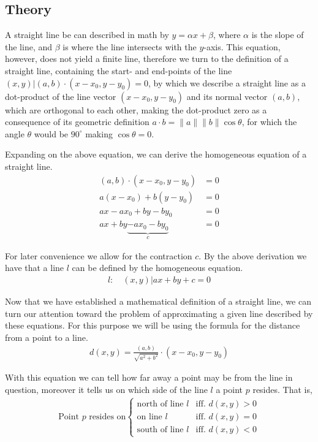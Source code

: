 \documentclass[11pt]{article}
\newcommand{\norm}[1]{\lVert#1\rVert}
\begin{document}
\subsection{Theory}
A straight line be can described in math by $y = \alpha x + \beta$, where
$\alpha$ is the slope of the line, and $\beta$ is where the line intersects
with the $y$-axis. This equation, however, does not yield a finite line,
therefore we turn to the definition of a straight line, containing the start-
and end-points of the line ${(x,y) | (a,b) \cdot (x - x_0, y - y_0) = 0}$,
by which we describe a straight line as a dot-product of the line vector
$(x - x_0, y - y_0)$ and its normal vector $(a,b)$, which are orthogonal to
each other, making the dot-product zero as a consequence of its geometric
definition $a \cdot b = \norm{a} \norm{b} \cos \theta$, for which the angle
$\theta$ would be $90^{\circ}$ making $\cos \theta = 0$.

Expanding on the above equation, we can derive the homogeneous equation of a
straight line.
\begin{align}
    (a,b) \cdot (x - x_0, y - y_0) &= 0 \\
    a(x - x_0) + b(y - y_0) &= 0 \\
    ax - ax_0 + by - by_0 &= 0 \\
    ax + by \underbrace{- ax_0 - by_0}_{c} &= 0
\end{align}

For later convenience we allow for the contraction $c$. By the above
derivation we have that a line $l$ can be defined by the homogeneous equation.
\begin{align}
    l: \quad {(x,y) | ax + by + c = 0}
\end{align}

Now that we have established a mathematical definition of a straight line, we
can turn our attention toward the problem of approximating a given line
described by these equations. For this purpose we will be using the formula
for the distance from a point to a line.
\begin{align}
    d(x,y) = \frac{(a,b)}{\sqrt{a^2 + b^2}} \cdot (x - x_0, y - y_0)
\end{align}

With this equation we can tell how far away a point may be from the line in
question, moreover it tells us on which side of the line $l$ a point $p$
resides. That is,
\begin{align}
    \text{Point $p$ resides on}
    \begin{cases}
        \text{north of line $l$} &\mbox{iff. $d(x,y) > 0$} \\
        \text{on line $l$} &\mbox{iff. $d(x,y) = 0$} \\
        \text{south of line $l$} &\mbox{iff. $d(x,y) < 0$}
    \end{cases}
    \label{eqn:distance-properties}
\end{align}
\end{document}
